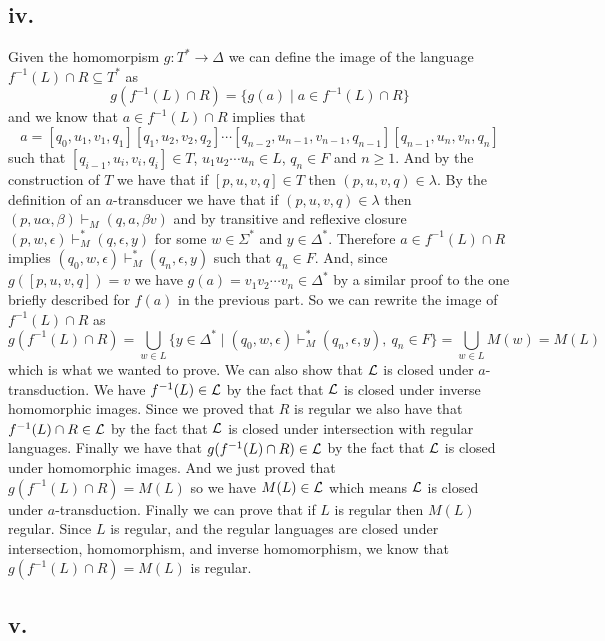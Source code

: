 \documentclass[12pt]{article}
\begin{document}
\subsection*{iv.}
Given the homomorpism $g : T^* \rightarrow \Delta$ we can define the image of
the language $f^{-1}(L)\cap R\subseteq T^*$ as
$$g(f^{-1}(L)\cap R) = \{g(a) \mid a \in f^{-1}(L)\cap R\}$$
and we know that $a \in f^{-1}(L)\cap R$ implies that $$a =
[q_0, u_1, v_1, q_1][q_1, u_2, v_2, q_2]\cdots
[q_{n-2}, u_{n-1}, v_{n-1}, q_{n-1}][q_{n-1}, u_n, v_n, q_n]$$ such that
$[q_{i-1}, u_i, v_i, q_i]\in T$, $u_1u_2\cdots u_n\in L$, $q_n\in F$ and
$n\geq 1$. And by the construction of $T$ we have that if $[p,u,v,q] \in T$
then $(p,u,v,q) \in \lambda$. By the definition of an $a$-transducer we have
that if $(p,u,v,q) \in \lambda$ then $(p, u\alpha, \beta) \vdash_M (q,a,\beta v)$
and by transitive and reflexive closure
$(p,w, \epsilon) \vdash_M^* (q,\epsilon,y)$ for some $w \in \Sigma^*$ and
$y \in \Delta^*$. Therefore $a \in f^{-1}(L)\cap R$ implies
$(q_0,w,\epsilon) \vdash_M^* (q_n, \epsilon, y)$ such that $q_n \in F$.
And, since $g([p,u,v,q]) = v$ we have $g(a) = v_1v_2\cdots v_n \in \Delta^*$ by
a similar proof to the one briefly described for $f(a)$ in the previous part.
So we can rewrite the image of $f^{-1}(L)\cap R$ as
$$g(f^{-1}(L)\cap R) = \bigcup _{w\in L} \{y \in \Delta^*
\mid (q_0, w, \epsilon) \vdash_M^* (q_n, \epsilon, y),\ q_n \in F\} =
\bigcup _{w\in L} M(w) = M(L)$$
which is what we wanted to prove. We can also show that ${\cal L}$ is closed under
$a$-transduction. We have $f^{-1}(L) \in {\cal L}$ by the fact that ${\cal L}$ is
closed under inverse homomorphic images. Since we proved that $R$ is regular we
also have that $f^{-1}(L) \cap R \in {\cal L}$ by the fact that ${\cal L}$ is closed
under intersection with regular languages. Finally we have that
$g(f^{-1}(L) \cap R) \in {\cal L}$ by the fact that ${\cal L}$ is closed under
homomorphic images. And we just proved that $g(f^{-1}(L) \cap R) = M(L)$ so we
have $M(L) \in {\cal L}$ which means ${\cal L}$ is closed under $a$-transduction.
Finally we can prove that if $L$ is regular then $M(L)$ regular. Since $L$ is
regular, and the regular languages are closed under intersection, homomorphism,
and inverse homomorphism, we know that $g(f^{-1}(L) \cap R) = M(L)$ is regular.

\subsection*{v.}
\end{document}
